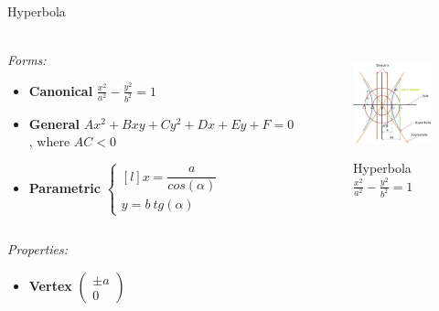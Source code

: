 \documentclass[aspectratio=169]{beamer}
\begin{document}
    \begin{frame}[t]{Hyperbola}
        \framesubtitle{}
            \scriptsize
            \vspace{-0.4cm}
        \begin{columns}[T,onlytextwidth]
            \begin{column}{0.59\textwidth}
                \textit{Forms:} \\
                \begin{itemize}
                    \item \textbf{Canonical} $\frac{x^2}{a^2}-\frac{y^2}{b^2}=1$
                    \item \textbf{General} $Ax^2+Bxy+Cy^2+Dx+Ey+F=0$, where $AC < 0$
                    \item \textbf{Parametric} $\left\{\begin{matrix*}[l] x = \dfrac{a}{cos(\alpha)}\\ y = b\ tg(\alpha) \end{matrix*}\right.$
                \end{itemize}
            \end{column}
            \begin{column}{0.39\textwidth}
                \vspace{-0.5cm}
                \begin{figure}[H]
                    \centering\includegraphics[height=3cm,width=1\textwidth,keepaspectratio]{Hyperbola.jpg}
                    \vspace{-0.4cm}
                    \caption*{\scriptsize Hyperbola $\frac{x^2}{a^2}-\frac{y^2}{b^2}=1$}
                    \label{fig:Hyperbola.jpg}
                \end{figure}
            \end{column}
        \end{columns}
        \vspace{-0.5cm}
        \textit{Properties:}
        \begin{multicols}{3}
            \begin{itemize}
                \item \textbf{Vertex} $\begin{pmatrix} \pm a\\0 \end{pmatrix}$

\end{itemize}
\end{multicols}
\end{frame}
\end{document}
